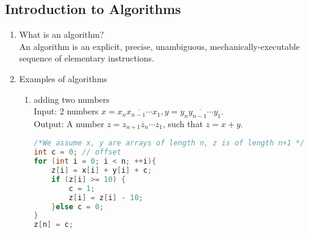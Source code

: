 \documentclass[11pt]{article}
\begin{document}
\subsection{Introduction to Algorithms}
\begin{enumerate}
\item What is an algorithm?\\
An algorithm is an explicit, precise, unambiguous, mechanically-executable sequence of elementary instructions.
\item Examples of algorithms
\begin{enumerate}
\item adding two numbers\\
Input: 2 numbers $x = \overline{x_{n} x_{n-1} \cdots x_{1}}, y = \overline{y_{n} y_{n-1} \cdots y_{1}}$.\\
Output: A number $z= \overline{z_{n+1} z_{n} \cdots z_{1}}$, such that $z = x+y$.
\begin{lstlisting}[language = C++]
/*We assume x, y are arrays of length n, z is of length n+1 */
int c = 0; // offset
for (int i = 0; i < n; ++i){
	z[i] = x[i] + y[i] + c;
	if (z[i] >= 10) {
		c = 1;
		z[i] = z[i] - 10;	
	}else c = 0;
}
z[n] = c;
\end{lstlisting}
\end{enumerate}
\end{enumerate}
\end{document}
